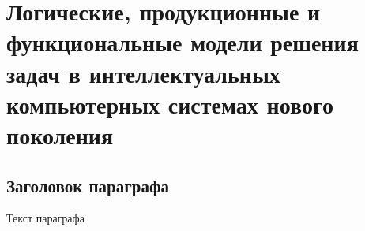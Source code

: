 \chapter{Логические, продукционные и функциональные модели решения задач в интеллектуальных компьютерных системах нового поколения}
\label{chapter_logic_productions}


\section{Заголовок параграфа}
Текст параграфа

%